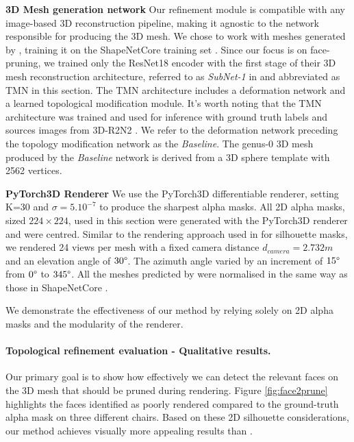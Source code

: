 \noindent\textbf{3D Mesh generation network} Our refinement module is compatible with any image-based 3D reconstruction pipeline, making it agnostic to the network responsible for producing the 3D mesh. We chose to work with meshes generated by \citep{pan2019deep}, training it on the ShapeNetCore training set \citep{chang2015shapenet}. Since our focus is on face-pruning, we trained only the ResNet18 encoder with the first stage of their 3D mesh reconstruction architecture, referred to as \textit{SubNet-1} in \citep{pan2019deep} and abbreviated as TMN in this section. The TMN architecture includes a deformation network and a learned topological modification module. It's worth noting that the TMN architecture \citep{pan2019deep} was trained and used for inference with  ground truth labels and sources images from 3D-R2N2 \citep{choy20163d}. We refer to the deformation network preceding the topology modification network \citep{pan2019deep} as the \textit{Baseline}. The genus-0 3D mesh produced by the \textit{Baseline} network is derived from a 3D sphere template with 2562 vertices.

\noindent\textbf{PyTorch3D Renderer} We use the PyTorch3D \citep{nie2020total3dunderstanding} differentiable renderer, setting K=30 and $\sigma=5.10^{-7}$ to produce the sharpest alpha masks. All 2D alpha masks, sized $224\times 224$, used in this section were generated with the PyTorch3D renderer and were centred. Similar to the rendering approach used in \citep{choy20163d,liu2019soft,yan2016perspective} for silhouette masks, we rendered 24 views per mesh with a fixed camera distance $d_{camera}=2.732m$ and an elevation angle of $30\degree$. The azimuth angle varied by an increment of $15\degree$ from $0\degree$ to $345\degree$. All the meshes predicted by \citep{pan2019deep} were normalised in the same way as those in ShapeNetCore \citep{chang2015shapenet}. 

We demonstrate the effectiveness of our method by relying solely on 2D alpha masks and the modularity of the renderer. 

\paragraph{Topological refinement evaluation - Qualitative results.} Our primary goal is to show how effectively we can detect the relevant faces on the 3D mesh that should be pruned during rendering. Figure \ref{fig:face2prune} highlights the faces identified as poorly rendered compared to the ground-truth alpha mask on three different chairs. Based on these 2D silhouette considerations, our method achieves visually more appealing results than \citep{pan2019deep}. 

